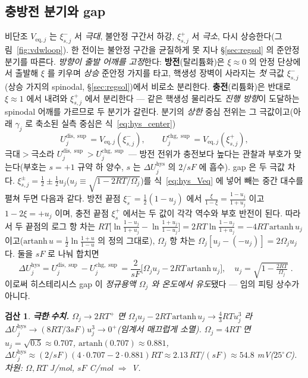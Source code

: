 \documentclass[11pt,a4paper]{article}
\newtheorem*{verifybox}{검산}
\newcommand{\eq}{\mathrm{eq}}
\newcommand{\dis}{\mathrm{dis}}
\newcommand{\chg}{\mathrm{chg}}
\newcommand{\hys}{\mathrm{hys}}
\begin{document}
\subsection{충방전 분기와 gap}
비단조 $V_{\eq,j}$ 는 $\xi_{s,j}^-$ 서 \emph{극대}, 불안정 구간서 하강, $\xi_{s,j}^+$ 서 \emph{극소}, 다시
상승한다(그림~\ref{fig:vdwloop}).
한 전이는 불안정 구간을 균질하게 못 지나 \S\ref{sec:regsol} 의 준안정 분기를 따른다. \emph{방향이 출발 어깨를
고정}한다: \textbf{방전}(탈리튬화)은 $\xi\!\approx\!0$ 의 안정 단상에서 출발해 $\xi$ 를 키우며 \emph{상승} 준안정 가지를
타고, 핵생성 장벽이 사라지는 \emph{첫} 극값 $\xi_{s,j}^-$(상승 가지의 spinodal, \S\ref{sec:regsol})에서 비로소 분리한다.
\textbf{충전}(리튬화)은 반대로 $\xi\!\approx\!1$ 에서 내려와 $\xi_{s,j}^+$ 에서 분리한다 — 같은 핵생성 물리라도 \emph{진행
방향}이 도달하는 spinodal 어깨를 가르므로 두 분기가 갈린다. 분기의 \emph{상한} 중심 전위는 그 극값이고(아래
$\gamma_j$ 로 축소된 실측 중심은 식~\eqref{eq:hys_center})
\begin{equation}
U_j^{\dis,\sup}=V_{\eq,j}(\xi_{s,j}^-),\qquad U_j^{\chg,\sup}=V_{\eq,j}(\xi_{s,j}^+),
\label{eq:hys_branchU}
\end{equation}
극대$>$극소라 $U_j^{\dis,\sup}>U_j^{\chg,\sup}$ — 방전 전위가 충전보다 높다는 관찰과 부호가 맞는다(부호는 $s=+1$
규약 하 양수, $s$ 는 $\Delta U_j^\hys$ 의 $2/sF$ 에 흡수). gap 은 두 극값 차다.
$\xi_{s,j}^\pm=\tfrac12\pm\tfrac12 u_j$($u_j\equiv\sqrt{1-2RT/\Omega_j}$)를 식~\eqref{eq:hys_Veq} 에 넣어
빼는 중간 대수를 펼쳐 두면 다음과 같다. 방전 끝점 $\xi_{s}^-=\tfrac12(1-u_j)$ 에서
$\tfrac{\xi}{1-\xi}=\tfrac{1-u_j}{1+u_j}$ 이고 $1-2\xi=+u_j$ 이며, 충전 끝점 $\xi_s^+$ 에서는 두 값이 각각
역수와 부호 반전이 된다. 따라서 두 끝점의 로그 항 차는
$RT\big[\ln\tfrac{1-u_j}{1+u_j}-\ln\tfrac{1+u_j}{1-u_j}\big]=2RT\ln\tfrac{1-u_j}{1+u_j}
=-4RT\,\mathrm{artanh}\,u_j$ 이고($\mathrm{artanh}\,u=\tfrac12\ln\tfrac{1+u}{1-u}$ 의 정의 그대로),
$\Omega_j$ 항 차는 $\Omega_j[u_j-(-u_j)]=2\Omega_j u_j$ 다. 둘을 $sF$ 로 나눠 합치면
\begin{equation}
\boxed{\;\Delta U_j^\hys=U_j^{\dis,\sup}-U_j^{\chg,\sup}=\frac{2}{sF}\big[\Omega_j u_j-2RT\,\mathrm{artanh}\,u_j\big],\quad
u_j=\sqrt{1-\tfrac{2RT}{\Omega_j}}\;.}
\label{eq:hys_dU}
\end{equation}
이로써 히스테리시스 gap 이 \emph{정규용액 $\Omega_j$ 와 온도에서 유도}됐다 — 임의 피팅 상수가 아니다.
\begin{verifybox}
\textbf{극한$\cdot$수치.} $\Omega_j\to2RT^+$ 면 $\Omega_j u_j-2RT\,\mathrm{artanh}\,u_j\to\tfrac43RT u_j^3$ 라
$\Delta U_j^\hys\to(8RT/3sF)u_j^3\to0^+$(임계서 매끄럽게 소멸). $\Omega_j=4RT$ 면 $u_j=\sqrt{0.5}\approx0.707$,
$\mathrm{artanh}(0.707)\approx0.881$, $\Delta U_j^\hys\approx(2/sF)(4{\cdot}0.707-2{\cdot}0.881)RT\approx2.13\,RT/(sF)
\approx54.8$ mV($25^\circ$C). 차원: $\Omega,RT$ J/mol, $sF$ C/mol $\Rightarrow$ V.
\end{verifybox}
\end{document}
